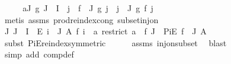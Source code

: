 \begin{isabellebody}
%
\isadelimproof
%
\endisadelimproof
%
\isatagproof
{}\isamarkupfalse%
\ {\isacharminus}{\kern0pt}\isanewline
\ \ \isamarkupfalse%
\ a{\isacharcolon}{\kern0pt}{\isachardoublequoteopen}{\isasymAnd}J\ g{\isachardot}{\kern0pt}\ J\ {\isasymsubseteq}\ I\ {\isasymLongrightarrow}\ {\isacharparenleft}{\kern0pt}{\isasymProd}j\ {\isasymin}\ f\ {\isacharbackquote}{\kern0pt}\ J{\isachardot}{\kern0pt}\ g\ j{\isacharparenright}{\kern0pt}\ {\isacharequal}{\kern0pt}\ {\isacharparenleft}{\kern0pt}{\isasymProd}j\ {\isasymin}\ J{\isachardot}{\kern0pt}\ g\ {\isacharparenleft}{\kern0pt}f\ j{\isacharparenright}{\kern0pt}{\isacharparenright}{\kern0pt}{\isachardoublequoteclose}\isanewline
\ \ \ \ \isamarkupfalse%
\ {\isacharparenleft}{\kern0pt}metis\ assms\ prod{\isachardot}{\kern0pt}reindex{\isacharunderscore}{\kern0pt}cong\ subset{\isacharunderscore}{\kern0pt}inj{\isacharunderscore}{\kern0pt}on{\isacharparenright}{\kern0pt}\isanewline
\isanewline
\ \ \isamarkupfalse%
\ {\isachardoublequoteopen}{\isasymAnd}J{\isachardot}{\kern0pt}\ J\ {\isasymsubseteq}\ I\ {\isasymLongrightarrow}\ {\isacharparenleft}{\kern0pt}{\isasymPi}\isactrlsub E\ i\ {\isasymin}\ J{\isachardot}{\kern0pt}\ A\ {\isacharparenleft}{\kern0pt}f\ i{\isacharparenright}{\kern0pt}{\isacharparenright}{\kern0pt}\ {\isacharequal}{\kern0pt}\ {\isacharparenleft}{\kern0pt}{\isasymlambda}a{\isachardot}{\kern0pt}\ restrict\ {\isacharparenleft}{\kern0pt}a\ {\isasymcirc}\ f{\isacharparenright}{\kern0pt}\ J{\isacharparenright}{\kern0pt}\ {\isacharbackquote}{\kern0pt}\ PiE\ {\isacharparenleft}{\kern0pt}f\ {\isacharbackquote}{\kern0pt}\ J{\isacharparenright}{\kern0pt}\ A{\isachardoublequoteclose}\isanewline
\ \ \ \ \isamarkupfalse%
\ {\isacharparenleft}{\kern0pt}subst\ PiE{\isacharunderscore}{\kern0pt}reindex{\isacharbrackleft}{\kern0pt}symmetric{\isacharbrackright}{\kern0pt}{\isacharparenright}{\kern0pt}\isanewline
\ \ \ \ \isamarkupfalse%
\ assms\ inj{\isacharunderscore}{\kern0pt}on{\isacharunderscore}{\kern0pt}subset\ \isamarkupfalse%
\ blast\isanewline
\ \ \ \ \isamarkupfalse%
\ {\isacharparenleft}{\kern0pt}simp\ add{\isacharcolon}{\kern0pt}\ comp{\isacharunderscore}{\kern0pt}def{\isacharparenright}{\kern0pt}\isanewline
\isanewline
\ \ \isamarkupfalse%

\end{isabellebody}
